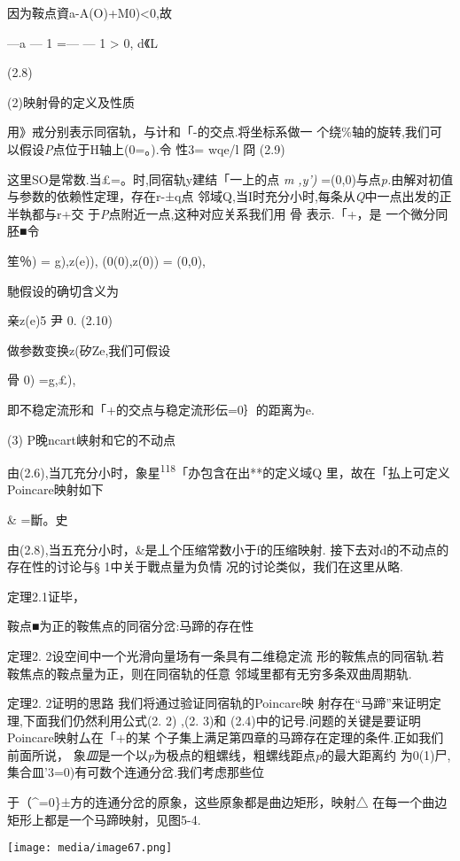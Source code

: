 \documentclass{article}
\begin{document}
因为鞍点資a-A(O)+M0)\textless{}0,故

---a --- 1 =--- --- 1 \textgreater{} 0, \textbar{}d《L

(2.8)

(2)映射骨的定义及性质

用》戒分别表示同宿轨，与计和「-的交点.将坐标系做一
个绕\%轴的旋转,我们可以假设\emph{P}点位于H轴上(0=。).令 性3= wqe/l 冏
(2.9)

这里SO是常数.当£=。时,同宿轨y建结「一上的点 \emph{m ,y')}
=(0,0)与点\emph{p.}由解对初值与参数的依赖性定理，存在r-±q点
邻域Q,当I时充分小时,每条从\emph{Q}中一点出发的正半執都与r+交
于\emph{P}点附近一点,这种对应关系我们用 骨 表示.「+，是 一个微分同胚■令

笙％) = g),z(e)), (0(0),z(0)) = (0,0),

馳假设的确切含义为

亲z(e)\textbar{}5 尹 0. (2.10)

做参数变换z(矽Ze,我们可假设

骨 0) =g,£),

即不稳定流形和「+的交点与稳定流形伝=0｝的距离为\textbar{}e\textbar{}.

(3) P晚ncart峡射和它的不动点

由(2.6),当兀充分小时，象星\textsuperscript{118}「办包含在出**的定义域Q
里，故在「払上可定义Poincare映射如下

\& =斷。史

由(2.8),当五充分小时，\&是丄个压缩常数小于f的压缩映射.
接下去对d的不动点的存在性的讨论与§ 1中关于戰点量为负情
况的讨论类似，我们在这里从略.

定理2.1证毕，\textbar{}

鞍点■为正的鞍焦点的同宿分岔:马蹄的存在性

定理2. 2设空间中一个光滑向量场有一条具有二维稳定流
形的鞍焦点的同宿轨.若鞍焦点的鞍点量为正，则在同宿轨的任意
邻域里都有无穷多条双曲周期轨.

定理2. 2证明的思路 我们将通过验证同宿轨的Poincare映
射存在``马蹄''来证明定理,下面我们仍然利用公式(2. 2) ,(2. 3)和
(2.4)中的记号.问题的关键是要证明Poincare映射厶在「+的某
个子集上满足第四章的马蹄存在定理的条件.正如我们前面所说，
象\emph{皿}是一个以\emph{p}为极点的粗螺线，粗螺线距点\emph{p}的最大距离约
为0(1)尸,集合皿'3=0)有可数个连通分岔.我们考虑那些位

于（\^{}=0\}±方的连通分岔的原象，这些原象都是曲边矩形，映射△
在每一个曲边矩形上都是一个马蹄映射，见图5-4.

\texttt{[image: media/image67.png]}
\end{document}
